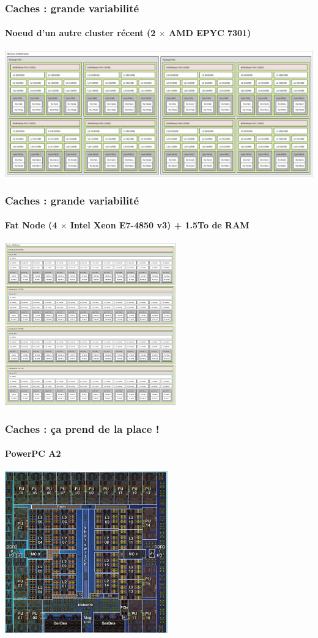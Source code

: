 \documentclass[xcolor={x11names,svgnames}, 14pt]{beamer}
\begin{document}
\begin{frame}[label=caches]
  \frametitle{Caches : grande variabilité}
  \framesubtitle{Noeud d'un autre cluster récent (2 $\times$ AMD EPYC 7301)}
  \centering
  \includegraphics[width=\textwidth]{lstopo_chiclet.pdf}
\end{frame}

\begin{frame}[label=caches]
  \frametitle{Caches : grande variabilité}
  \framesubtitle{Fat Node (4 $\times$ Intel Xeon E7-4850 v3) + 1.5To de RAM}
  \centering
  \includegraphics[height=7cm]{lstopo_wurst.pdf}
\end{frame}

\begin{frame}[label=caches]
  \frametitle{Caches : ça prend de la place !}
  \framesubtitle{PowerPC A2}
  \centering
  \includegraphics[height=7cm]{die-bgq.png}
\end{frame}
\end{document}
